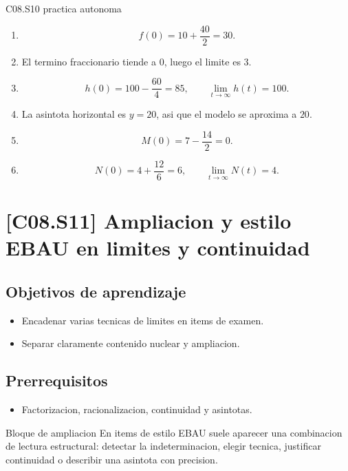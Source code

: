 \begin{fullsolution}{C08.S10 practica autonoma}
\begin{enumerate}[label=\textbf{PX-C08.S10-\arabic*:}, leftmargin=*]
  \item
  \[
  f(0)=10+\frac{40}{2}=30.
  \]
  \item El termino fraccionario tiende a \(0\), luego el limite es \(3\).
  \item
  \[
  h(0)=100-\frac{60}{4}=85,\qquad \lim_{t\to\infty}h(t)=100.
  \]
  \item La asintota horizontal es \(y=20\), asi que el modelo se aproxima a \(20\).
  \item
  \[
  M(0)=7-\frac{14}{2}=0.
  \]
  \item
  \[
  N(0)=4+\frac{12}{6}=6,\qquad \lim_{t\to\infty}N(t)=4.
  \]
\end{enumerate}
\end{fullsolution}

\section{[C08.S11] Ampliacion y estilo EBAU en limites y continuidad}

\subsection*{Objetivos de aprendizaje}
\begin{itemize}
  \item Encadenar varias tecnicas de limites en items de examen.
  \item Separar claramente contenido nuclear y ampliacion.
\end{itemize}

\subsection*{Prerrequisitos}
\begin{itemize}
  \item Factorizacion, racionalizacion, continuidad y asintotas.
\end{itemize}

\begin{theorybox}{Bloque de ampliacion}
En items de estilo EBAU suele aparecer una combinacion de lectura estructural: detectar la
indeterminacion, elegir tecnica, justificar continuidad o describir una asintota con precision.
\end{theorybox}

